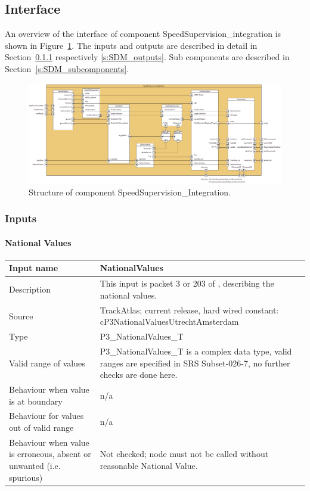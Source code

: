 \subsection{Interface}

An overview of the interface of component SpeedSupervision\_integration is shown in Figure~\ref{f:ssv}. The inputs and outputs are described in detail in Section~\ref{s:SDM_inputs} respectively \ref{s:SDM_outputs}. Sub components are described in Section~\ref{s:SDM_subcomponents}.

\begin{figure}
\centering
\includegraphics[width=0.95\textheight, angle=90]{../images/speedsupervision.png}
\caption{Structure of component SpeedSupervision\_Integration.}\label{f:ssv}
\end{figure}



\subsubsection{Inputs}\label{s:SDM_inputs}

\paragraph{National Values}

\begin{longtable}{p{}p{}}
\toprule
Input name				& NationalValues \\
\midrule
Description				& This input is packet 3 or 203 of \cite[Chapt.~8]{subset-026}, describing the national values.  \\
\midrule
Source					& TrackAtlas; current release, hard wired constant: cP3NationalValuesUtrechtAmsterdam \\
\midrule
Type					& P3\_NationalValues\_T \\
\midrule
Valid range of values	& P3\_NationalValues\_T is a complex data type, valid ranges are specified in SRS Subset-026-7, no further checks are done here. \\
\midrule
Behaviour when value is at boundary	& n/a \\
\midrule
Behaviour for values out of valid range	& n/a \\
\midrule
Behaviour when value is erroneous, absent or unwanted (i.e. spurious) & Not checked; node must not be called without reasonable National Value. \\
\bottomrule
\end{longtable}


